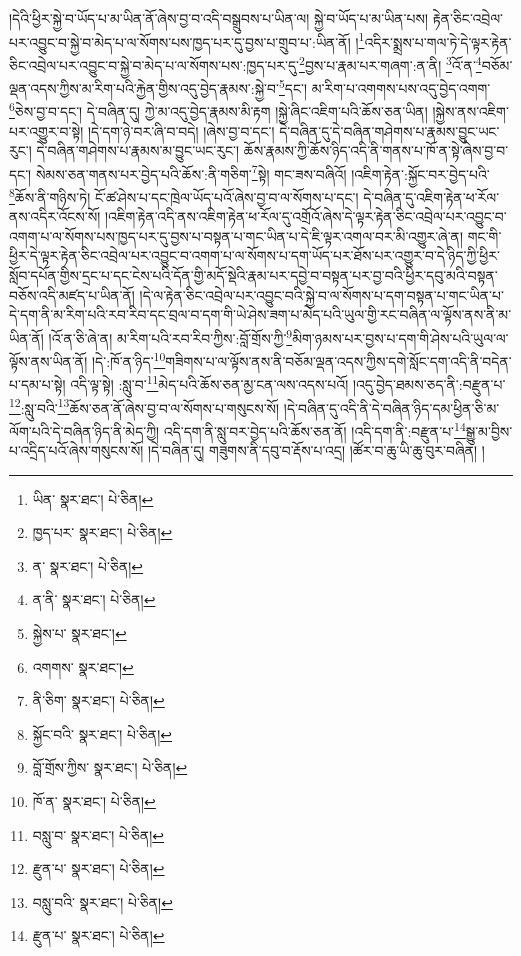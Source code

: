 །དེའི་ཕྱིར་སྐྱེ་བ་ཡོད་པ་མ་ཡིན་ནོ་ཞེས་བྱ་བ་འདི་བསྒྲུབས་པ་ཡིན་ལ། སྐྱེ་བ་ཡོད་པ་མ་ཡིན་པས། རྟེན་ཅིང་འབྲེལ་པར་འབྱུང་བ་སྐྱེ་བ་མེད་པ་ལ་སོགས་པས་ཁྱད་པར་དུ་བྱས་པ་གྲུབ་པ་:ཡིན་ནོ། །\footnote{ཡིན་  སྣར་ཐང་།  པེ་ཅིན། }འདིར་སྨྲས་པ་གལ་ཏེ་དེ་ལྟར་རྟེན་ཅིང་འབྲེལ་པར་འབྱུང་བ་སྐྱེ་བ་མེད་པ་ལ་སོགས་པས་:ཁྱད་པར་དུ་\footnote{ཁྱད་པར་  སྣར་ཐང་།  པེ་ཅིན། }བྱས་པ་རྣམ་པར་གཞག་:ན་ནི། \footnote{ན་  སྣར་ཐང་།  པེ་ཅིན། }འོ་ན་\footnote{ན་ནི་  སྣར་ཐང་།  པེ་ཅིན། }བཅོམ་ལྡན་འདས་ཀྱིས་མ་རིག་པའི་རྐྱེན་གྱིས་འདུ་བྱེད་རྣམས་:སྐྱེ་བ་\footnote{སྐྱེས་པ་  སྣར་ཐང་། }དང་། མ་རིག་པ་འགགས་པས་འདུ་བྱེད་འགག་\footnote{འགགས་  སྣར་ཐང་། }ཅེས་བྱ་བ་དང་། དེ་བཞིན་དུ། ཀྱེ་མ་འདུ་བྱེད་རྣམས་མི་རྟག །སྐྱེ་ཞིང་འཇིག་པའི་ཆོས་ཅན་ཡིན། །སྐྱེས་ནས་འཇིག་པར་འགྱུར་བ་སྟེ། །དེ་དག་ཉེ་བར་ཞི་བ་བདེ། །ཞེས་བྱ་བ་དང་། དེ་བཞིན་དུ་དེ་བཞིན་གཤེགས་པ་རྣམས་བྱུང་ཡང་རུང་། དེ་བཞིན་གཤེགས་པ་རྣམས་མ་བྱུང་ཡང་རུང་། ཆོས་རྣམས་ཀྱི་ཆོས་ཉིད་འདི་ནི་གནས་པ་ཁོ་ན་སྟེ་ཞེས་བྱ་བ་དང་། སེམས་ཅན་གནས་པར་བྱེད་པའི་ཆོས་:ནི་གཅིག་\footnote{ནི་ཅིག་  སྣར་ཐང་།  པེ་ཅིན། }སྟེ། གང་ཟས་བཞིའོ། །འཇིག་རྟེན་:སྐྱོང་བར་བྱེད་པའི་\footnote{སྐྱོང་བའི་  སྣར་ཐང་།  པེ་ཅིན། }ཆོས་ནི་གཉིས་ཏེ། ངོ་ཚ་ཤེས་པ་དང་ཁྲེལ་ཡོད་པའོ་ཞེས་བྱ་བ་ལ་སོགས་པ་དང་། དེ་བཞིན་དུ་འཇིག་རྟེན་ཕ་རོལ་ནས་འདིར་འོངས་སོ། །འཇིག་རྟེན་འདི་ནས་འཇིག་རྟེན་ཕ་རོལ་དུ་འགྲོའོ་ཞེས་དེ་ལྟར་རྟེན་ཅིང་འབྲེལ་པར་འབྱུང་བ་འགག་པ་ལ་སོགས་པས་ཁྱད་པར་དུ་བྱས་པ་བསྟན་པ་གང་ཡིན་པ་དེ་ཇི་ལྟར་འགལ་བར་མི་འགྱུར་ཞེ་ན། གང་གི་ཕྱིར་དེ་ལྟར་རྟེན་ཅིང་འབྲེལ་པར་འབྱུང་བ་འགག་པ་ལ་སོགས་པ་དག་ཡོད་པར་ཐོས་པར་འགྱུར་བ་དེ་ཉིད་ཀྱི་ཕྱིར་སློབ་དཔོན་གྱིས་དྲང་པ་དང་ངེས་པའི་དོན་གྱི་མདོ་སྡེའི་རྣམ་པར་དབྱེ་བ་བསྟན་པར་བྱ་བའི་ཕྱིར་དབུ་མའི་བསྟན་བཅོས་འདི་མཛད་པ་ཡིན་ནོ། །དེ་ལ་རྟེན་ཅིང་འབྲེལ་པར་འབྱུང་བའི་སྐྱེ་བ་ལ་སོགས་པ་དག་བསྟན་པ་གང་ཡིན་པ་དེ་དག་ནི་མ་རིག་པའི་རབ་རིབ་དང་བྲལ་བ་དག་གི་ཡེ་ཤེས་ཟག་པ་མེད་པའི་ཡུལ་གྱི་རང་བཞིན་ལ་ལྟོས་ནས་ནི་མ་ཡིན་ནོ། །འོ་ན་ཅི་ཞེ་ན། མ་རིག་པའི་རབ་རིབ་ཀྱིས་:བློ་གྲོས་ཀྱི་\footnote{བློ་གྲོས་ཀྱིས་  སྣར་ཐང་།  པེ་ཅིན། }མིག་ཉམས་པར་བྱས་པ་དག་གི་ཤེས་པའི་ཡུལ་ལ་ལྟོས་ནས་ཡིན་ནོ། །དེ་:ཁོ་ན་ཉིད་\footnote{ཁོ་ན་  སྣར་ཐང་།  པེ་ཅིན། }གཟིགས་པ་ལ་ལྟོས་ནས་ནི་བཅོམ་ལྡན་འདས་ཀྱིས་དགེ་སློང་དག་འདི་ནི་བདེན་པ་དམ་པ་སྟེ། འདི་ལྟ་སྟེ། :སླུ་བ་\footnote{བསླུ་བ་  སྣར་ཐང་།  པེ་ཅིན། }མེད་པའི་ཆོས་ཅན་མྱ་ངན་ལས་འདས་པའོ། །འདུ་བྱེད་ཐམས་ཅད་ནི་:བརྫུན་པ་\footnote{རྫུན་པ་  སྣར་ཐང་།  པེ་ཅིན། }:སླུ་བའི་\footnote{བསླུ་བའི་  སྣར་ཐང་།  པེ་ཅིན། }ཆོས་ཅན་ནོ་ཞེས་བྱ་བ་ལ་སོགས་པ་གསུངས་སོ། །དེ་བཞིན་དུ་འདི་ནི་དེ་བཞིན་ཉིད་དམ་ཕྱིན་ཅི་མ་ལོག་པའི་དེ་བཞིན་ཉིད་ནི་མེད་ཀྱི། འདི་དག་ནི་སླུ་བར་བྱེད་པའི་ཆོས་ཅན་ནོ། །འདི་དག་ནི་:བརྫུན་པ་\footnote{རྫུན་པ་  སྣར་ཐང་།  པེ་ཅིན། }སྒྱུ་མ་བྱིས་པ་འདྲིད་པའོ་ཞེས་གསུངས་སོ། །དེ་བཞིན་དུ། གཟུགས་ནི་དབུ་བ་རྡོས་པ་འདྲ། །ཚོར་བ་ཆུ་ཡི་ཆུ་བུར་བཞིན། །
